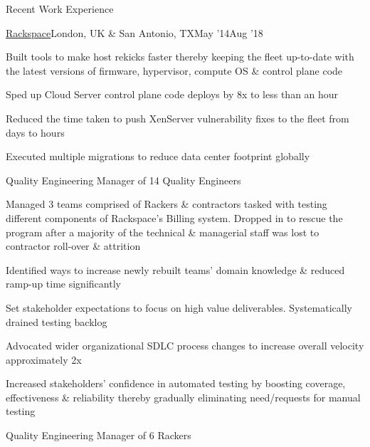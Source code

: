 \documentclass{resume} %
\begin{document}
\begin{rSection}{Recent Work Experience}
\begin{rSubsection}{\href{https://www.rackspace.com/}{Rackspace}}{London, UK \& San Antonio, TX}{May '14}{Aug '18}
    \item Built tools to make host rekicks faster thereby keeping the fleet up-to-date with the latest versions of firmware, hypervisor, compute OS \& control plane code
    \item Sped up Cloud Server control plane code deploys by 8x to less than an hour
    \item Reduced the time taken to push XenServer vulnerability fixes to the fleet from days to hours
    \item Executed multiple migrations to reduce data center footprint globally

\end{rSubsection}\vspace{-1em}

  
\begin{rSubsection}{}{}{}{}
{Quality Engineering Manager of 14 Quality Engineers}
  \item Managed 3 teams comprised of Rackers \& contractors tasked with testing different components of Rackspace's Billing system. Dropped in to rescue the program after a majority of the technical \& managerial staff was lost to contractor roll-over \& attrition
\item Identified ways to increase newly rebuilt teams' domain knowledge \& reduced ramp-up time significantly
\item Set stakeholder expectations to focus on high value deliverables. Systematically drained testing backlog
\item Advocated wider organizational SDLC process changes to increase overall velocity approximately 2x
\item Increased stakeholders' confidence in automated testing by boosting coverage, effectiveness \& reliability thereby gradually eliminating need/requests for manual testing
  
\end{rSubsection}\vspace{-1em}



\begin{rSubsection}{}{}{}{}
{Quality Engineering Manager of 6 Rackers}


\end{rSubsection}
\end{rSection}
\end{document}

